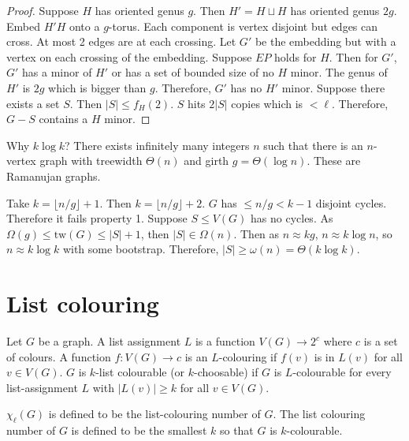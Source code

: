\documentclass[]{article}
\newcommand{\tw}{\text{tw}}
\theoremstyle{definition}
\numberwithin{theorem}{section}
\numberwithin{equation}{section}
\begin{document}
\begin{proof}
	Suppose $H$ has oriented genus $g$. Then $H' = H \sqcup H$ has oriented genus $2g$.
	Embed $H' H$ onto a $g$-torus. Each component is vertex disjoint but edges can cross. At most 2 edges are at each crossing. Let $G'$ be the embedding but with a vertex on each crossing of the embedding. Suppose $EP$ holds for $H$. Then for $G'$, $G'$ has a minor of $H'$ or has a set of bounded size of no $H$ minor. The genus of $H'$ is $2 g$ which is bigger than $g$. Therefore, $G'$ has no $H'$ minor. Suppose there exists a set $S$. Then $|S| \leq f_H(2)$. $S$ hits $2 |S|$ copies which is $< \ell$. Therefore, $G - S$ contains a $H$ minor.
\end{proof}

Why $k \log k$? There exists infinitely many integers $n$ such that there is an $n$-vertex graph with treewidth $\Theta(n)$ and girth $g = \Theta(\log n)$. These are Ramanujan graphs.

Take $k = \lfloor n/g \rfloor + 1$. Then $k = \lfloor n/g \rfloor + 2$. $G$ has $\leq n/g < k - 1$ disjoint cycles. Therefore it fails property 1. Suppose $S \leq V(G)$ has no cycles. As $\Omega(g) \leq \tw(G) \leq |S| + 1$, then $|S| \in \Omega(n)$. Then as $n \approx k g$, $n \approx k \log n$, so $n \approx k \log k$ with some bootstrap. Therefore, $|S| \geq \omega(n) = \Theta(k \log k)$. 

\section{List colouring}
Let $G$ be a graph.
A list assignment $L$ is a function $V(G) \rightarrow 2^c$ where $c$ is a set of colours. A function $f: V(G) \rightarrow c$ is an $L$-colouring if $f(v)$ is in $L(v)$ for all $v \in V(G)$. $G$ is $k$-list colourable (or $k$-choosable) if $G$ is $L$-colourable for every list-assignment $L$ with $|L(v)| \geq k$ for all $v \in V(G)$. 

$\chi_\ell(G)$ is defined to be the list-colouring number of $G$. The list colouring number of $G$ is defined to be the smallest $k$ so that $G$ is $k$-colourable.
\end{document}
